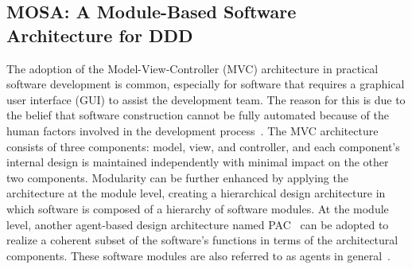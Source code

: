 \subsection{MOSA: A Module-Based Software Architecture for DDD}
\label{sect:bg-arch} %

The adoption of the Model-View-Controller (MVC) architecture in practical software development is common, especially for software that requires a graphical user interface (GUI) to assist the development team. The reason for this is due to the belief that software construction cannot be fully automated because of the human factors involved in the development process~\cite{fuggetta_software_2014}. The MVC architecture consists of three components: model, view, and controller, and each component's internal design is maintained independently with minimal impact on the other two components. Modularity can be further enhanced by applying the architecture at the module level, creating a hierarchical design architecture in which software is composed of a hierarchy of software modules. At the module level, another agent-based design architecture named PAC~\cite{coutaz_pac:_1987} can be adopted to realize a coherent subset of the software's functions in terms of the architectural components. These software modules are also referred to as agents in general~\cite{calvary_single-user_1997}.

